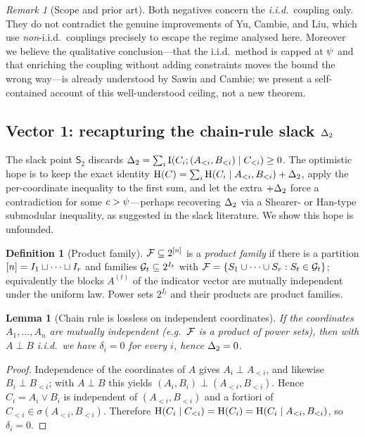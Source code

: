 \documentclass[11pt]{amsart}
\newtheorem{lemma}[theorem]{Lemma}
\theoremstyle{definition}
\newtheorem{definition}[theorem]{Definition}
\theoremstyle{remark}
\newtheorem{remark}[theorem]{Remark}
\begin{document}
\begin{remark}[Scope and prior art]\label{rmk:scope-neg}
Both negatives concern the \emph{i.i.d.}\ coupling only. They do not contradict
the genuine improvements of Yu, Cambie, and Liu, which use \emph{non}-i.i.d.\
couplings precisely to escape the regime analysed here. Moreover we believe the
qualitative conclusion---that the i.i.d.\ method is capped at $\psi$ and that
enriching the coupling without adding constraints moves the bound the wrong
way---is already understood by Sawin and Cambie; we present a self-contained
account of this well-understood ceiling, not a new theorem.
\end{remark}

\subsection{Vector 1: recapturing the chain-rule slack \texorpdfstring{$\Delta_2$}{Delta-2}}
\label{ssec:vector1}

The slack point $\mathsf S_2$ discards
$\Delta_2=\sum_i\operatorname{I}(C_i;(A_{<i},B_{<i})\mid C_{<i})\ge 0$. The optimistic hope is to
keep the exact identity $\operatorname{H}(C)=\sum_i\operatorname{H}(C_i\mid A_{<i},B_{<i})+\Delta_2$, apply
the per-coordinate inequality to the first sum, and let the extra $+\Delta_2$ force a
contradiction for some $c>\psi$---perhaps recovering $\Delta_2$ via a Shearer- or
Han-type submodular inequality, as suggested in the slack literature. We show this
hope is unfounded.

\begin{definition}[Product family]\label{def:product}
$\mathcal{F}\subseteq2^{[n]}$ is a \emph{product family} if there is a
partition $[n]=I_1\sqcup\cdots\sqcup I_r$ and families
$\mathcal G_t\subseteq2^{I_t}$ with
$\mathcal{F}=\{S_1\cup\cdots\cup S_r:S_t\in\mathcal G_t\}$; equivalently the blocks
$A^{(t)}$ of the indicator vector are mutually independent under the uniform law.
Power sets $2^{I_t}$ and their products are product families.
\end{definition}

\begin{lemma}[Chain rule is lossless on independent coordinates]\label{lem:product}
If the coordinates $A_1,\dots,A_n$ are mutually independent (e.g.\ $\mathcal{F}$ is a
product of power sets), then with $A\perp B$ i.i.d.\ we have $\delta_i=0$ for
every $i$, hence $\Delta_2=0$.
\end{lemma}

\begin{proof}
Independence of the coordinates of $A$ gives $A_i\perp A_{<i}$, and likewise
$B_i\perp B_{<i}$; with $A\perp B$ this yields
$(A_i,B_i)\perp(A_{<i},B_{<i})$. Hence $C_i=A_i\vee B_i$ is independent of
$(A_{<i},B_{<i})$ and a fortiori of $C_{<i}\in\sigma(A_{<i},B_{<i})$. Therefore
$\operatorname{H}(C_i\mid C_{<i})=\operatorname{H}(C_i)=\operatorname{H}(C_i\mid A_{<i},B_{<i})$, so $\delta_i=0$.
\end{proof}
\end{document}
